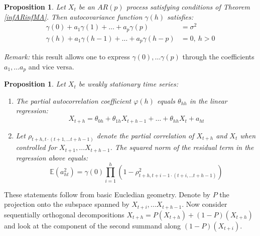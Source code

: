 \documentclass[12pt]{article}
\newtheorem{proposition}[theorem]{Proposition}
\theoremstyle{definition}
\theoremstyle{remark}
\numberwithin{equation}{section}
\newcommand{\EE}{\mathbb{E}}
\begin{document}
\begin{proposition}
	Let $X_t$ be an $AR(p)$ process satisfying conditions of Theorem \ref{infARinfMA}. Then autocovariance function $\gamma(h)$ satisfies:
	\begin{align*}
		\gamma(0) + a_1\gamma(1) +\ldots +a_p\gamma(p) &= \sigma^2\\
		\gamma(h) + a_1\gamma(h-1) +\ldots +a_p\gamma(h-p) &= 0,\ h>0
	\end{align*}
\end{proposition}
\noindent\emph{Remark:} this result allows one to express $\gamma(0), \ldots \gamma(p)$ through the coefficients $a_1,\ldots a_p$ and vice versa.

\begin{proposition}\label{pac_properties} Let $X_t$ be weakly stationary time series:
	\begin{enumerate}
		\item The partial autocorrelation coefficient $\varphi(h)$ equals $\theta_{hh}$ in the linear regression:
		\begin{equation*}
			X_{t+h} = \theta_{0h} + \theta_{1h}X_{t+h-1} + \ldots + \theta_{hh}X_t + a_{ht}
		\end{equation*}
		\item Let $\rho_{t+h,t\cdot(t+1, \ldots t+h-1)}$ denote the partial correlation of $X_{t+h}$ and $X_t$ when controlled for $X_{t+1}, \ldots X_{t+h-1}$. The squared norm of the residual term in the regression above equals:
		\begin{equation*}
			\EE(a_{ht}^2) = \gamma(0)\prod_{i = 1}^{h}(1-\rho_{t+h, t+i-1\cdot(t+i, \ldots t+h-1)}^2)
		\end{equation*}
	\end{enumerate}
\end{proposition}
\proof These statements follow from basic Eucledian geometry. Denote by $P$ the projection onto the subspace spanned by $X_{t+i}, \ldots X_{t+h-1}$. Now consider sequentially orthogonal decompositions $X_{t+h} = P(X_{t+h}) + (1 - P)(X_{t+h})$ and look at the component of the second summand along $(1 - P)(X_{t+i})$.
\end{document}
